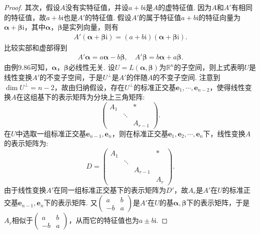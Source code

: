 \documentclass[../../main.tex]{subfiles}
\begin{document}
\begin{proof}
其次，假设\(A\)没有实特征值，并设\(a + b\mathrm{i}\)是\(A\)的虚特征值. 因为\(A\)和\(A'\)有相同的特征值，故\(a + b\mathrm{i}\)也是\(A'\)的特征值. 假设\(A'\)的属于特征值\(a + b\mathrm{i}\)的特征向量为\(\boldsymbol{\alpha}+ \boldsymbol{\beta}\mathrm{i}\)，其中\(\boldsymbol{\alpha}\)，\(\boldsymbol{\beta}\)是实列向量，则有
\begin{align*}
A'(\boldsymbol{\alpha}+ \boldsymbol{\beta}\mathrm{i})=(a + b\mathrm{i})(\boldsymbol{\alpha}+ \boldsymbol{\beta}\mathrm{i}).
\end{align*}
比较实部和虚部得到
\begin{align*}
A'\boldsymbol{\alpha}=a\boldsymbol{\alpha}-b\boldsymbol{\beta},\quad A'\boldsymbol{\beta}=b\boldsymbol{\alpha}+a\boldsymbol{\beta}.
\end{align*}
由例9.86可知，\(\boldsymbol{\alpha}\)，\(\boldsymbol{\beta}\)必线性无关. 设\(U = L(\boldsymbol{\alpha},\boldsymbol{\beta})\)为\(\mathbb{R}^n\)的子空间，则上式表明\(U\)是线性变换\(A'\)的不变子空间，于是\(U^\perp\)是\(A'\)的伴随\(A\)的不变子空间. 注意到\(\dim U^\perp=n - 2\)，故由归纳假设，存在\(U^\perp\)的标准正交基\(\boldsymbol{e}_1,\cdots,\boldsymbol{e}_{n - 2}\)，使得线性变换\(A\)在这组基下的表示矩阵为分块上三角矩阵:
\[
\begin{pmatrix}
A_1 & & * \\
& \ddots & \\
& & A_{r - 1}
\end{pmatrix}.
\]
在\(U\)中选取一组标准正交基\(\boldsymbol{e}_{n - 1},\boldsymbol{e}_n\)，则在标准正交基\(\boldsymbol{e}_1,\boldsymbol{e}_2,\cdots,\boldsymbol{e}_n\)下，线性变换\(A\)的表示矩阵为:
\[
D = 
\begin{pmatrix}
A_1 & & & * \\
& \ddots & & \\
& & A_{r - 1} & \\
& & & A_r
\end{pmatrix}.
\]
由于线性变换\(A'\)在同一组标准正交基下的表示矩阵为\(D'\)，故\(A_r\)是\(A'\)在\(U\)的标准正交基\(\boldsymbol{e}_{n - 1},\boldsymbol{e}_n\)下的表示矩阵. 又\(\begin{pmatrix}a&b\\-b&a\end{pmatrix}\)是\(A'\)在\(U\)的基\(\boldsymbol{\alpha},\boldsymbol{\beta}\)下的表示矩阵，于是\(A_r\)相似于\(\begin{pmatrix}a&b\\-b&a\end{pmatrix}\)，从而它的特征值也为\(a\pm b\mathrm{i}\). 
\end{proof}
\end{document}
